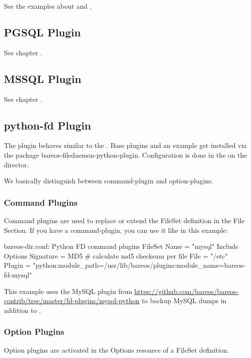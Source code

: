 See the examples about  and .


\subsection{PGSQL Plugin}

See chapter .


\subsection{MSSQL Plugin}

See chapter .


\subsection{python-fd Plugin}

The  plugin behaves similar to the . Base plugins and an example get installed via the package bareos-filedaemon-python-plugin.
Configuration is done in the  on the director.

We basically distinguish between command-plugin and option-plugins. 

\subsubsection{Command Plugins}
Command plugins are used to replace or extend the FileSet definition in the File Section. If you have a command-plugin, 
you can use it like in this example:

\begin{bconfig}{bareos-dir.conf: Python FD command plugins}
FileSet {
  Name = "mysql"
  Include {
    Options {
      Signature = MD5 # calculate md5 checksum per file
    }
    File = "/etc"
    Plugin = "python:module_path=/usr/lib/bareos/plugins:module_name=bareos-fd-mysql"
  }
} 
\end{bconfig}

This example uses the MySQL plugin from \url{https://github.com/bareos/bareos-contrib/tree/master/fd-plugins/mysql-python} to backup MySQL dumps in addition to .

\subsubsection{Option Plugins}
Option plugins are activated in the Options resource of a FileSet definition.


